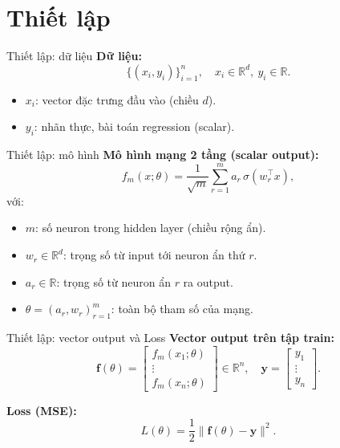 \section{Thiết lập}
\begin{frame}{Thiết lập: dữ liệu}
  \textbf{Dữ liệu:}
  \[
    \{(x_i,y_i)\}_{i=1}^n,\quad x_i \in \mathbb R^d,\ y_i \in \mathbb R.
  \]
  \begin{itemize}
    \item $x_i$: vector đặc trưng đầu vào (chiều $d$).
    \item $y_i$: nhãn thực, bài toán regression (scalar).
  \end{itemize}
\end{frame}

\begin{frame}{Thiết lập: mô hình}
  \textbf{Mô hình mạng 2 tầng (scalar output):}
  \[
    f_m(x;\theta)
      = \frac{1}{\sqrt{m}} \sum_{r=1}^m a_r\,\sigma(w_r^\top x),
  \]
  với:
  \begin{itemize}
    \item $m$: số neuron trong hidden layer (chiều rộng ẩn).
    \item $w_r \in \mathbb R^d$: trọng số từ input tới neuron ẩn thứ $r$.
    \item $a_r \in \mathbb R$: trọng số từ neuron ẩn $r$ ra output.
    \item $\theta = (a_r, w_r)_{r=1}^m$: toàn bộ tham số của mạng.
  \end{itemize}
\end{frame}

\begin{frame}{Thiết lập: vector output và Loss}
  \textbf{Vector output trên tập train:}
  \[
    \mathbf f(\theta) =
    \begin{bmatrix}
      f_m(x_1;\theta)\\ \vdots \\ f_m(x_n;\theta)
    \end{bmatrix}
    \in \mathbb R^n,
    \quad
    \mathbf y =
    \begin{bmatrix}
      y_1\\ \vdots \\ y_n
    \end{bmatrix}.
  \]

  \textbf{Loss (MSE):}
  \[
    L(\theta) = \frac{1}{2}\|\mathbf f(\theta) - \mathbf y\|^2.
  \]
\end{frame}
